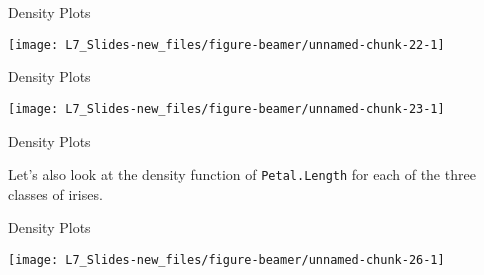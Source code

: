 \documentclass[ignorenonframetext,]{beamer}
\newenvironment{Shaded}{\begin{snugshade}}{\end{snugshade}}
\newcommand{\KeywordTok}[1]{\textcolor{white}{\textbf{{#1}}}}
\newcommand{\NormalTok}[1]{\textcolor{yellow}{{#1}}}
\newcommand{\DataTypeTok}[1]{\textcolor{yellow}{{#1}}}
\newcommand{\StringTok}[1]{\textcolor{yellow}{{#1}}}
\begin{document}
\begin{frame}[fragile]{Density Plots}

\small

\begin{Shaded}
\end{Shaded}

\begin{center}\texttt{[image: L7\_Slides-new\_files/figure-beamer/unnamed-chunk-22-1]} \end{center}

\end{frame}

\begin{frame}[fragile]{Density Plots}

\small

\begin{Shaded}
\end{Shaded}

\begin{center}\texttt{[image: L7\_Slides-new\_files/figure-beamer/unnamed-chunk-23-1]} \end{center}

\end{frame}

\begin{frame}[fragile]{Density Plots}

Let's also look at the density function of \texttt{Petal.Length} for
each of the three classes of irises.

\small

\small

\end{frame}

\begin{frame}{Density Plots}

\small

\begin{center}\texttt{[image: L7\_Slides-new\_files/figure-beamer/unnamed-chunk-26-1]} \end{center}

\end{frame}
\end{document}
